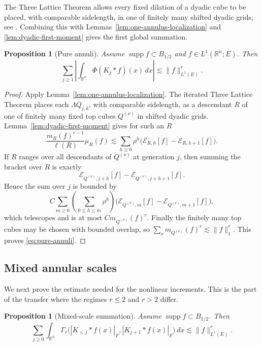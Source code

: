 \documentclass[11pt]{amsart}
\numberwithin{equation}{section}
\newtheorem{proposition}[theorem]{Proposition}
\theoremstyle{definition}
\theoremstyle{remark}
\newcommand{\R}{\mathbb R}
\newcommand{\supp}{\operatorname{supp}}
\newcommand{\norm}[1]{\lVert #1\rVert}
\begin{document}
The Three Lattice Theorem allows every fixed dilation of a dyadic cube to be
placed, with comparable sidelength, in one of finitely many shifted dyadic
grids; see \cite[Section~3]{LernerNazarov19}.  Combining this with
Lemmas~\ref{lem:one-annulus-localization} and
\ref{lem:dyadic-first-moment} gives the first global summation.

\begin{proposition}[Pure annuli]\label{prop:pure-annuli}
Assume $\supp f\subset B_{1/2}$ and $f\in L^1(\R^n;E)$.  Then
\begin{equation}\label{eq:pure-annuli}
 \sum_{j\ge1}
 \left|\int_{\R^n}\Phi(K_j*f)(x)\,dx\right|
 \lesssim \norm f_{L^1(E)}^r.
\end{equation}
\end{proposition}

\begin{proof}
Apply Lemma~\ref{lem:one-annulus-localization}.  The iterated Three Lattice
Theorem places each $\Lambda Q_{j,k}$, with comparable sidelength, as a
descendant $R$ of one of finitely many fixed top cubes $Q^{(\nu)}$ in shifted
dyadic grids.  Lemma~\ref{lem:dyadic-first-moment} gives for such an $R$
\[
 \frac{m_R(f)^{r-1}}{\ell(R)}\mu_R(f)
 \lesssim\sum_{h\ge0}\rho^h
 \bigl(\mathcal E_{R,h}[f]-\mathcal E_{R,h+1}[f]\bigr).
\]
If $R$ ranges over all descendants of $Q^{(\nu)}$ at generation $j$, then
summing the bracket over $R$ is exactly
\[
 \mathcal E_{Q^{(\nu)},j+h}[f]
 -\mathcal E_{Q^{(\nu)},j+h+1}[f].
\]
Hence the sum over $j$ is bounded by
\[
 C\sum_{m\ge0}
 \left(\sum_{0\le h\le m}\rho^h\right)
 \bigl(\mathcal E_{Q^{(\nu)},m}[f]
       -\mathcal E_{Q^{(\nu)},m+1}[f]\bigr),
\]
which telescopes and is at most $C m_{Q^{(\nu)}}(f)^r$.  Finally the finitely
many top cubes may be chosen with bounded overlap, so
$\sum_\nu m_{Q^{(\nu)}}(f)^r\lesssim\norm f_1^r$.  This proves
\eqref{eq:pure-annuli}.
\end{proof}

\subsection{Mixed annular scales}
We next prove the estimate needed for the nonlinear increments.  This is the
part of the transfer where the regimes $r\le2$ and $r>2$ differ.

\begin{proposition}[Mixed-scale summation]\label{prop:mixed-scales}
Assume $\supp f\subset B_{1/2}$.  Then
\begin{equation}\label{eq:mixed-scales}
 \sum_{j\ge0}\int_{\R^n}
 \Gamma_r\bigl(|K_{\le j}*f(x)|_F,|K_{j+1}*f(x)|_F\bigr)\,dx
 \lesssim \norm f_{L^1(E)}^r.
\end{equation}
\end{proposition}
\end{document}
